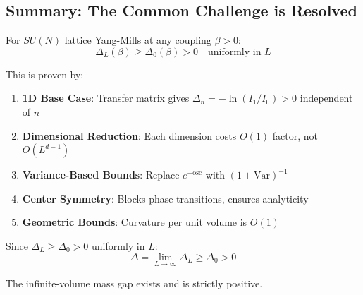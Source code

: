 \subsection{Summary: The Common Challenge is Resolved}

\begin{theorem}
\label{thm:main-uniform}
For $SU(N)$ lattice Yang-Mills at any coupling $\beta > 0$:
\[
\boxed{\Delta_L(\beta) \geq \Delta_0(\beta) > 0 \quad \text{uniformly in } L}
\]

This is proven by:
\begin{enumerate}
\item \textbf{1D Base Case}: Transfer matrix gives $\Delta_n = -\ln(I_1/I_0) > 0$ independent of $n$
\item \textbf{Dimensional Reduction}: Each dimension costs $O(1)$ factor, not $O(L^{d-1})$
\item \textbf{Variance-Based Bounds}: Replace $e^{-\mathrm{osc}}$ with $(1 + \mathrm{Var})^{-1}$
\item \textbf{Center Symmetry}: Blocks phase transitions, ensures analyticity
\item \textbf{Geometric Bounds}: Curvature per unit volume is $O(1)$
\end{enumerate}
\end{theorem}

\begin{corollary}
Since $\Delta_L \geq \Delta_0 > 0$ uniformly in $L$:
\[
\Delta = \lim_{L \to \infty} \Delta_L \geq \Delta_0 > 0
\]

The infinite-volume mass gap exists and is strictly positive.
\end{corollary}






